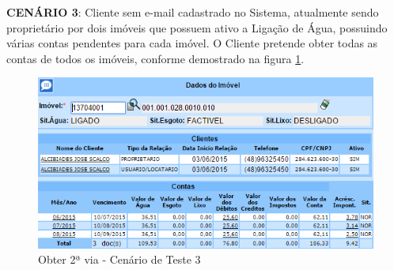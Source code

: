 \begin{flushleft}
	\begin{description}
		\item \textbf{CENÁRIO 3}: Cliente sem e-mail cadastrado no Sistema, atualmente sendo proprietário por dois imóveis que possuem ativo a Ligação de Água, possuindo várias contas pendentes para cada imóvel. O Cliente pretende obter todas as contas de todos os imóveis, conforme demostrado na figura \ref{figura:2ViaCenario3}.
		\begin{figure}[H]
			\centering
			\caption{Obter 2ª via - Cenário de Teste 3}
			\label{figura:2ViaCenario3}
			\includegraphics{figuras/cenarios/segunda_via/cenario_3.PNG}
		\end{figure}
	\end{description}
	
\end{flushleft}


